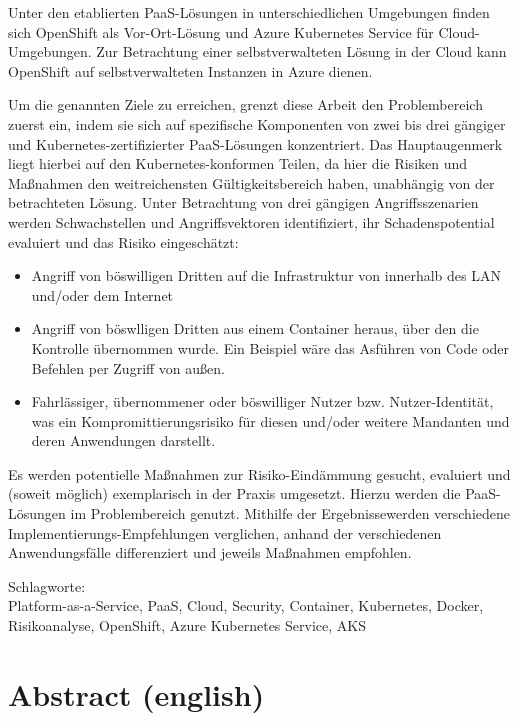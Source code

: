 Unter den etablierten PaaS-Lösungen in unterschiedlichen Umgebungen finden sich OpenShift als Vor-Ort-Lösung und Azure Kubernetes Service für Cloud-Umgebungen.
Zur Betrachtung einer selbstverwalteten Lösung in der Cloud kann OpenShift auf selbstverwalteten Instanzen in Azure dienen.

Um die genannten Ziele zu erreichen, grenzt diese Arbeit den Problembereich zuerst ein, indem sie sich auf spezifische Komponenten von zwei bis drei gängiger und Kubernetes-zertifizierter PaaS-Lösungen konzentriert.
Das Hauptaugenmerk liegt hierbei auf den Kubernetes-konformen Teilen, da hier die Risiken und Maßnahmen den weitreichensten Gültigkeitsbereich haben, unabhängig von der betrachteten Lösung.
Unter Betrachtung von drei gängigen Angriffsszenarien werden Schwachstellen und Angriffsvektoren identifiziert, ihr Schadenspotential evaluiert und das Risiko eingeschätzt:

\begin{itemize}

\item Angriff von böswilligen Dritten auf die Infrastruktur von innerhalb des LAN und/oder dem Internet

\item Angriff von böswlligen Dritten aus einem Container heraus, über den die Kontrolle übernommen wurde. Ein Beispiel wäre das Asführen von Code oder Befehlen per Zugriff von außen.

\item Fahrlässiger, übernommener oder böswilliger Nutzer bzw. Nutzer-Identität, was ein Kompromittierungsrisiko für diesen und/oder weitere Mandanten und deren Anwendungen darstellt.

\end{itemize}

Es werden potentielle Maßnahmen zur Risiko-Eindämmung gesucht, evaluiert und (soweit möglich) exemplarisch in der Praxis umgesetzt.
Hierzu werden die PaaS-Lösungen im Problembereich genutzt. Mithilfe der Ergebnissewerden verschiedene Implementierungs-Empfehlungen verglichen, anhand der verschiedenen Anwendungsfälle differenziert und jeweils Maßnahmen empfohlen.
\bigskip

\noindent
Schlagworte: \\
Platform-as-a-Service, PaaS, Cloud, Security, Container, Kubernetes, Docker, Risikoanalyse, OpenShift, Azure Kubernetes Service, AKS

\chapter*{Abstract (english)}
\thispagestyle{empty}

